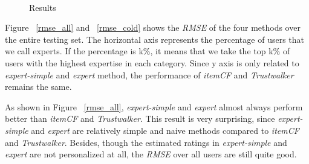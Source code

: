\documentclass[12pt]{article}
\begin{document}
\begin{figure}[htbp]
	\centering
	\\
	\caption{Results}
\end{figure}

Figure ~\ref{rmse_all} and ~\ref{rmse_cold} shows the \emph{RMSE} of the four methods over the entire testing set. The horizontal axis represents the percentage of users that we call experts. If the percentage is k\%, it means that we take the top k\% of users with the highest expertise in each category. Since y axis is only related to \emph{expert-simple} and \emph{expert} method, the performance of \emph{itemCF} and \emph{Trustwalker} remains the same. 

As shown in Figure ~\ref{rmse_all}, \emph{expert-simple} and \emph{expert} almost always perform better than \emph{itemCF} and \emph{Trustwalker}. This result is very surprising, since \emph{expert-simple} and \emph{expert} are relatively simple and naive methods compared to \emph{itemCF} and \emph{Trustwalker}. Besides, though the estimated ratings in \emph{expert-simple} and \emph{expert} are not personalized at all, the \emph{RMSE} over all users are still quite good. 
\end{document}
